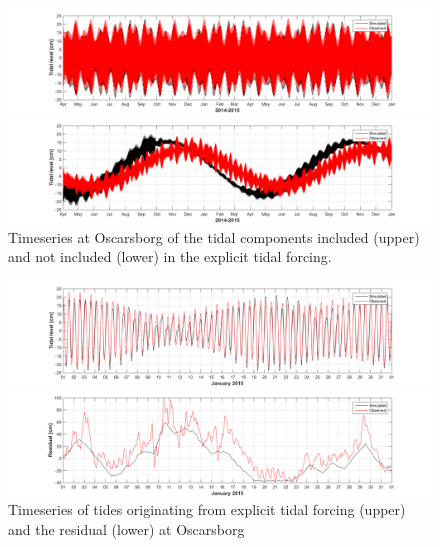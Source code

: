 \documentclass[12pt,a4paper,english]{article}
\begin{document}
\begin{figure}[t]
\centerline{
\includegraphics*[trim=3cm 0cm 2.5cm 0cm,clip=true,width=\textwidth]{Figurer/Oscarsborg_Tide_selected}
}
\centerline{
\includegraphics*[trim=3cm 0cm 2.5cm 0cm,clip=true,width=\textwidth]{Figurer/Oscarsborg_Tide_NorKyst800} 
}
\caption{\small
Timeseries at Oscarsborg of the tidal components included (upper) and not included (lower) in the explicit tidal forcing.}
\label{fig:Waterlevel_tide}
\end{figure}

\begin{figure}[t]
\centerline{
\includegraphics*[trim=3cm 0cm 2.5cm 0cm,clip=true,width=\textwidth]{Figurer/Oscarsborg_Tide_selected_jan15} 
}
\centerline{
\includegraphics*[trim=3cm 0cm 2.5cm 0cm,clip=true,width=\textwidth]{Figurer/Oscarsborg_WL_rest_jan15}
}
\caption{\small
Timeseries of tides originating from explicit tidal forcing (upper) and the residual (lower) at Oscarsborg}
\label{fig:Waterlevel_jan15}
\end{figure}
\end{document}
